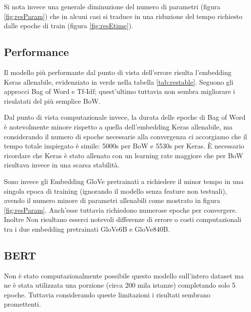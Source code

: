 Si nota invece una generale diminuzione del numero di parametri (figura
\ref{fig:resParam}) che in alcuni casi si traduce in una riduzione del tempo
richiesto dalle epoche di train (figura \ref{fig:resEtime}).

\subsection{Performance}
Il modello più performante dal punto di vista dell'errore risulta l'embedding
Keras allenabile, evidenziato in verde nella tabella \ref{tab:restable}. Seguono
gli approcci Bag of Word e Tf-Idf; quest'ultimo tuttavia non sembra migliorare i
risulatati del più semplice BoW.

Dal punto di vista computazionale invece, la durata delle epoche di Bag
of Word è notevolmente minore rispetto a quella dell'embedding Keras allenabile,
ma considerando il numero di epoche necessarie alla convergenza ci
accorgiamo che il tempo totale impiegato è simile: 5000s per BoW e 5530s per
Keras. È necessario ricordare che Keras è stato allenato con un learning
rate maggiore che per BoW risultava invece in una scarsa stabilità.

Sono invece gli Embedding GloVe pretrainati a richiedere il minor tempo in una
singola epoca di training (ignorando il modello senza feature non testuali),
avendo il numero minore di parametri allenabili come mostrato in figura
\ref{fig:resParam}. Anch'esse tuttavia richiedono numerose epoche per
convergere. Inoltre Non risultano esserci notevoli differenze di errore o costi
computazionali tra i due embedding pretrainati GloVe6B e GloVe840B.

\subsection{BERT}

Non è stato computazionalmente possibile questo modello sull'intero dataset ma
ne è stata utilizzata una porzione (circa 200 mila istanze) completando solo 5
epoche. Tuttavia considerando queste limitazioni i risultati sembrano
promettenti.